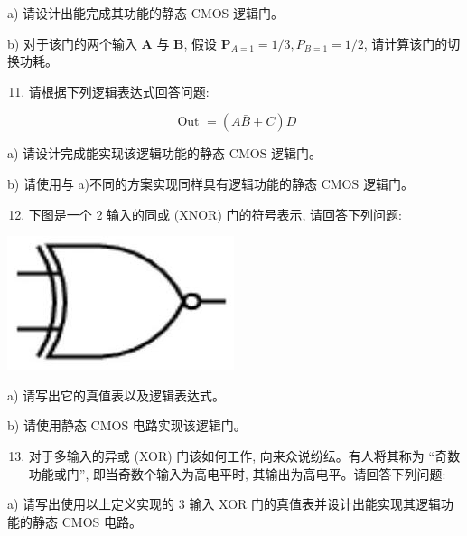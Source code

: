 \documentclass[10pt]{article}
\begin{document}
a) 请设计出能完成其功能的静态 CMOS 逻辑门。

b) 对于该门的两个输入 $\boldsymbol{A}$ 与 $\boldsymbol{B}$, 假设 $\boldsymbol{P}_{A=1}=1 / 3, P_{B=1}=1 / 2$, 请计算该门的切换功耗。

\begin{enumerate}
  \setcounter{enumi}{10}
  \item 请根据下列逻辑表达式回答问题:
\end{enumerate}

$$
\text { Out }=(A \bar{B}+C) D
$$

a) 请设计完成能实现该逻辑功能的静态 $\mathrm{CMOS}$ 逻辑门。

b) 请使用与 a)不同的方案实现同样具有逻辑功能的静态 CMOS 逻辑门。

\begin{enumerate}
  \setcounter{enumi}{11}
  \item 下图是一个 2 输入的同或 (XNOR) 门的符号表示, 请回答下列问题:
\end{enumerate}

\begin{center}
\includegraphics[max width=\textwidth]{2024_05_20_f1af48ad54173fe448ecg-3}
\end{center}

a) 请写出它的真值表以及逻辑表达式。

b) 请使用静态 CMOS 电路实现该逻辑门。

\begin{enumerate}
  \setcounter{enumi}{12}
  \item 对于多输入的异或 (XOR) 门该如何工作, 向来众说纷纭。有人将其称为 “奇数功能或门”, 即当奇数个输入为高电平时, 其输出为高电平。请回答下列问题:
\end{enumerate}

a) 请写出使用以上定义实现的 3 输入 XOR 门的真值表并设计出能实现其逻辑功能的静态 $\mathrm{CMOS}$ 电路。
\end{document}
